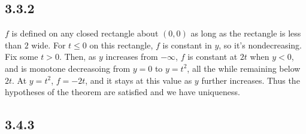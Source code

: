 \documentclass{article}
\begin{document}
\subsection*{3.3.2}
$f$ is defined on any closed rectangle about $(0,0)$ as long as the rectangle is less than $2$ wide. For $t\leq0$ on this rectangle, $f$ is constant in $y$, so it's nondecreasing. Fix some $t>0$. Then, as $y$ increases from $-\infty$, $f$ is constant at $2t$ when $y<0$, and is monotone decreasoing from $y=0$ to $y=t^2$, all the while remaining below $2t$. At $y=t^2$, $f=-2t$, and it stays at this value as $y$ further increases. Thus the hypotheses of the theorem are satisfied and we have uniqueness.
\subsection*{3.4.3}
\end{document}

